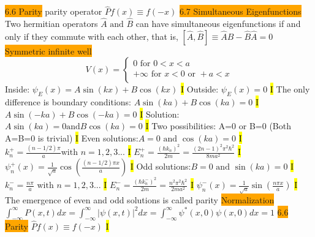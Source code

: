 \documentclass[fontsize=4pt]{scrartcl}
\begin{document}
\colorbox{Orange}{6.6 Parity}
parity operator $\hat{P}f(x) \equiv f(-x)$
\colorbox{Orange}{6.7 Simultaneous Eigenfunctions}
Two hermitian operators $\hat{A}  \text{ and } \hat{B}$ can have simultaneous eigenfunctions if and only if they commute with each other, that is, 
$[\hat{A},\hat{B}] \equiv \hat{A}\hat{B} - \hat{B}\hat{A} = 0$
\colorbox{Orange}{Symmetric infinite well}
\[
    V(x)=\left\{
                \begin{array}{ll}
                  0 \text{ for } 0< x < a\\
                  + \infty \text{ for } x < 0 \text{ or }+a < x\\
                \end{array}
              \right.
\]
Inside: $\psi_{E}(x)=A\sin(kx)+B\cos(kx)$
\hl{I}
Outside: $\psi_{E}(x)=0$
\hl{I}
The only difference is boundary conditions:
$A\sin(ka) + B\cos(ka) = 0$
\hl{I}
$A\sin(-ka) + B\cos(-ka) = 0$
\hl{I}
Solution: $A\sin(ka) = 0 \text{and} B\cos(ka) = 0$ 
\hl{I}
Two possibilities: A=0 or B=0 (Both A=B=0 is trivial)
\hl{I} 
Even solutions:$ A = 0 \text{ and } \cos(ka) = 0$ 
\hl{I}
$k_{n}^{+} = \frac{(n-1/2)\pi}{a} \text {with } n=1,2,3...$
\hl{I}
$E_{n}^{+} = \frac{(\hbar k_n)^2}{2m} = \frac{(2n-1)^2 \pi^2 \hbar^2}{8ma^2}$
\hl{I}
$\psi_{n}^{+}(x)=\frac{1}{\sqrt{a}}\cos(\frac{(n-1/2)\pi x}{a})$
\hl{I}
Odd solutions:$ B = 0 \text{ and } \sin(ka) = 0$
\hl{I}
$k_n^- =  \frac{n\pi}{a} \text{ with } n = 1,2,3...$
\hl{I}
$E_n^- = \frac{(\hbar k_n^-)^2}{2m} = \frac{n^2 \pi^2 \hbar^2}{2ma^2}$
\hl{I}
$\psi_n^- (x) = \frac{1}{\sqrt{a}} \sin(\frac{n\pi x}{a}) $
\hl{I}
The emergence of even and odd solutions is called parity
\colorbox{Orange}{Normalization}
$\int_{-\infty}^{\infty} P(x,t)dx = \int_{-\infty}^{\infty} |\psi(x,t)|^2 dx = \int_{-\infty}^{\infty} \psi^{*}(x,0) \psi(x,0) dx = 1$
\colorbox{Orange}{6.6 Parity}
$\hat{P}f(x) \equiv f(-x)$
\hl{I} 
\end{document}
